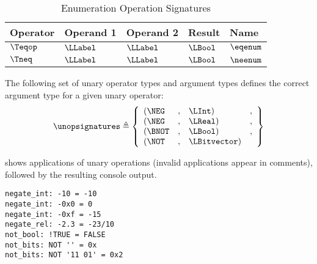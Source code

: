 \begin{table}[!htbp]
\caption{Enumeration Operation Signatures\label{ta:EnumerationOperators}}
\centering
\hypertarget{def-eqenum}{}
\hypertarget{def-neenum}{}
\begin{tabular}{lllll}
\hline
\textbf{Operator} & \textbf{Operand 1} & \textbf{Operand 2} & \textbf{Result} & \textbf{Name}\\
\hline
$\Teqop$  & $\LLabel$ & $\LLabel$ & $\LBool$ & $\eqenum$\\
$\Tneq$   & $\LLabel$ & $\LLabel$ & $\LBool$ & $\neenum$\\
\hline
\end{tabular}
\end{table}

\pagebreak
{}

\hypertarget{def-unopsignatures}{}
The following set of unary operator types and argument types defines the correct argument type
for a given unary operator:
\[
\unopsignatures \triangleq
\left\{
\begin{array}{lcll}
  (\NEG   &,& \LInt)        &,\\
  (\NEG   &,& \LReal)       &,\\
  (\BNOT  &,& \LBool)       &,\\
  (\NOT   &,& \LBitvector)  &\\
\end{array}
\right\}
\]

 shows applications of unary operations
(invalid applications appear in comments),
followed by the resulting console output.

\begin{Verbatim}[fontsize=\footnotesize, frame=single]
negate_int: -10 = -10
negate_int: -0x0 = 0
negate_int: -0xf = -15
negate_rel: -2.3 = -23/10
not_bool: !TRUE = FALSE
not_bits: NOT '' = 0x
not_bits: NOT '11 01' = 0x2
\end{Verbatim}

